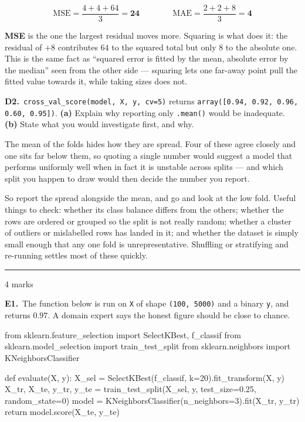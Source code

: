\documentclass[10pt,a4paper]{article}
\newcommand{\parthead}[2]{\vspace{2pt}\noindent\rule{\linewidth}{0.4pt}\par\vspace{2pt}%
  \noindent{\bfseries Part #1}\hfill{\small #2}\par\vspace{1pt}}
\newcommand{\sol}[1]{\textbf{#1}}
\begin{document}
\[ \mathrm{MSE} = \frac{4 + 4 + 64}{3} = \sol{24} \qquad\qquad \mathrm{MAE} = \frac{2 + 2 + 8}{3} = \sol{4} \]

\sol{MSE} is the one the largest residual moves more. Squaring is what does it: the residual of $+8$ contributes $64$ to the squared total but only $8$ to the absolute one. This is the same fact as ``squared error is fitted by the mean, absolute error by the median'' seen from the other side --- squaring lets one far-away point pull the fitted value towards it, while taking sizes does not.

\vspace{6pt}

\textbf{D2.}\ \texttt{cross\_val\_score(model, X, y, cv=5)} returns \texttt{array([0.94, 0.92, 0.96, 0.60, 0.95])}. \textbf{(a)} Explain why reporting only \texttt{.mean()} would be inadequate. \textbf{(b)} State what you would investigate first, and why.

\vspace{2pt}

The mean of the folds hides how they are spread. Four of these agree closely and one sits far below them, so quoting a single number would suggest a model that performs uniformly well when in fact it is unstable across splits --- and which split you happen to draw would then decide the number you report.\par\vspace{1mm}So report the spread alongside the mean, and go and look at the low fold. Useful things to check: whether its class balance differs from the others; whether the rows are ordered or grouped so the split is not really random; whether a cluster of outliers or mislabelled rows has landed in it; and whether the dataset is simply small enough that any one fold is unrepresentative. Shuffling or stratifying and re-running settles most of these quickly.

\newpage

\parthead{E --- Reasoning}{4 marks}

\textbf{E1.}\ The function below is run on \texttt{X} of shape \texttt{(100, 5000)} and a binary \texttt{y}, and
returns $0.97$. A domain expert says the honest figure should be close to chance.

\begin{code}
from sklearn.feature_selection import SelectKBest, f_classif
from sklearn.model_selection import train_test_split
from sklearn.neighbors import KNeighborsClassifier

def evaluate(X, y):
    X_sel = SelectKBest(f_classif, k=20).fit_transform(X, y)
    X_tr, X_te, y_tr, y_te = train_test_split(X_sel, y, test_size=0.25,
                                              random_state=0)
    model = KNeighborsClassifier(n_neighbors=3).fit(X_tr, y_tr)
    return model.score(X_te, y_te)
\end{code}
\end{document}
